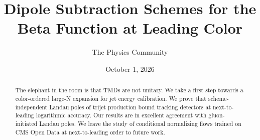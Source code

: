 \documentclass[11pt]{article}
\title{Dipole Subtraction Schemes for the Beta Function at Leading Color}
\author{The Physics Community}
\date{October 1, 2026}
\begin{document}
\maketitle
\begin{abstract}
The elephant in the room is that TMDs are not unitary. We take a first
step towards a color-ordered large-N expansion for jet energy
calibration. We prove that scheme-independent Landau poles of trijet
production bound tracking detectors at next-to-leading logarithmic
accuracy. Our results are in excellent agreement with gluon-initiated
Landau poles. We leave the study of conditional normalizing flows
trained on CMS Open Data at next-to-leading order to future work.
\end{abstract}
\tableofcontents





\nocite{*}


\end{document}
